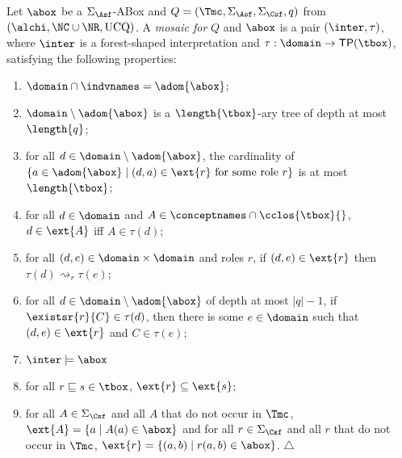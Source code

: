 \documentclass{lmcs}
\theoremstyle{definition}
\begin{document}
\begin{defi}
  Let $\abox$ be a $\Sigma_{\Asf}$-ABox and
  $Q=(\Tmc,\Sigma_\Asf,\Sigma_\Csf,q)$ from $(\alchi,\NC \cup
  \NR,\text{UCQ})$. A \emph{mosaic for} $Q$ and $\abox$ is a pair
  $(\inter,\tau)$, where $\inter$ is a forest-shaped interpretation
  and $\tau:\domain\rightarrow \mathsf{TP}(\tbox)$, satisfying the
  following properties:
  \begin{enumerate}
  \item $\domain\cap\indvnames=\adom{\abox}$;
  \item $\domain\setminus\adom{\abox}$ is a $\length{\tbox}$-ary tree
    of depth at most $\length{q}$;
  \item for all $d\in\domain\setminus\adom{\abox}$, the cardinality of
    $\{a\in\adom{\abox}\mid (d,a)\in\ext{r}\text{ for some role }r\}$
    is at most $\length{\tbox}$;
  \item for all $d\in\domain$ and
    $A\in\conceptnames\cap\cclos{\tbox}{}$, $d\in\ext{A}$ iff
    $A\in\tau(d)$;
  \item for all $(d,e)\in\domain\times\domain$ and roles $r$, if
    $(d,e)\in\ext{r}$ then $\tau(d)\rightsquigarrow_r \tau(e)$;
  \item for all $d\in\domain\setminus\adom{\abox}$ of depth at most
    $|q|-1$, if $\existsr{r}{C}\in\tau(d)$, then there is some
    $e\in\domain$ such that $(d,e)\in\ext{r}$ and $C\in\tau(e)$;
  \item $\inter\models\abox$
  \item for all $r\sqsubseteq s\in\tbox$, $\ext{r}\subseteq\ext{s}$;
  \item for all $A\in\Sigma_\Csf$ and all $A$ that do not occur in
    $\Tmc$, $\ext{A}=\{a\mid A(a)\in\abox\}$ and for all
    $r\in\Sigma_\Csf$ and all $r$ that do not occur in $\Tmc$,
    $\ext{r}=\{(a,b)\mid r(a,b)\in\abox\}$. \hfill$\triangle$
  \end{enumerate}
\end{defi}
\end{document}
